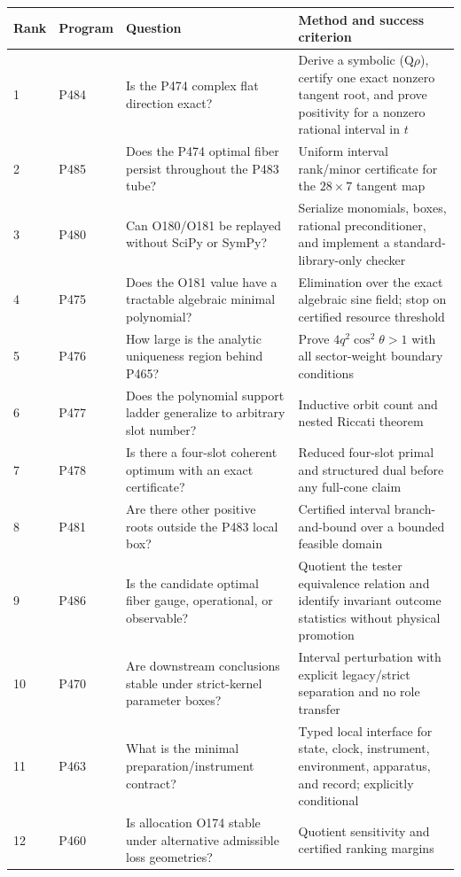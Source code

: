 \documentclass[11pt,a4paper,openany]{report}
\begin{document}
\begin{center}
\begingroup\small
\setlength{\tabcolsep}{2.5pt}
\renewcommand{\arraystretch}{1.16}
\begin{longtable}{@{}p{}p{}p{}p{}@{}}
\toprule
\textbf{Rank} & \textbf{Program} & \textbf{Question} & \textbf{Method and success criterion} \\
\midrule
\endhead
1 & P484 & Is the P474 complex flat direction exact? & Derive a symbolic (Q\(\rho\)), certify one exact nonzero tangent root, and prove positivity for a nonzero rational interval in \(t\) \\
2 & P485 & Does the P474 optimal fiber persist throughout the P483 tube? & Uniform interval rank/\allowbreak{}minor certificate for the \(28\times7\) tangent map \\
3 & P480 & Can O180/\allowbreak{}O181 be replayed without SciPy or SymPy? & Serialize monomials, boxes, rational preconditioner, and implement a standard-library-only checker \\
4 & P475 & Does the O181 value have a tractable algebraic minimal polynomial? & Elimination over the exact algebraic sine field; stop on certified resource threshold \\
5 & P476 & How large is the analytic uniqueness region behind P465? & Prove \(4q^2\cos^2\theta>1\) with all sector-weight boundary conditions \\
6 & P477 & Does the polynomial support ladder generalize to arbitrary slot number? & Inductive orbit count and nested Riccati theorem \\
7 & P478 & Is there a four-slot coherent optimum with an exact certificate? & Reduced four-slot primal and structured dual before any full-cone claim \\
8 & P481 & Are there other positive roots outside the P483 local box? & Certified interval branch-and-bound over a bounded feasible domain \\
9 & P486 & Is the candidate optimal fiber gauge, operational, or observable? & Quotient the tester equivalence relation and identify invariant outcome statistics without physical promotion \\
10 & P470 & Are downstream conclusions stable under strict-kernel parameter boxes? & Interval perturbation with explicit legacy/\allowbreak{}strict separation and no role transfer \\
11 & P463 & What is the minimal preparation/\allowbreak{}instrument contract? & Typed local interface for state, clock, instrument, environment, apparatus, and record; explicitly conditional \\
12 & P460 & Is allocation O174 stable under alternative admissible loss geometries? & Quotient sensitivity and certified ranking margins \\
\bottomrule
\end{longtable}
\endgroup
\end{center}
\end{document}
